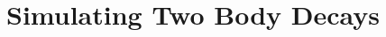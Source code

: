\documentclass[a4paper,12pt]{article}
\begin{document}


\section*{Simulating Two Body Decays}



\newpage
\nocite{*}

\end{document}
